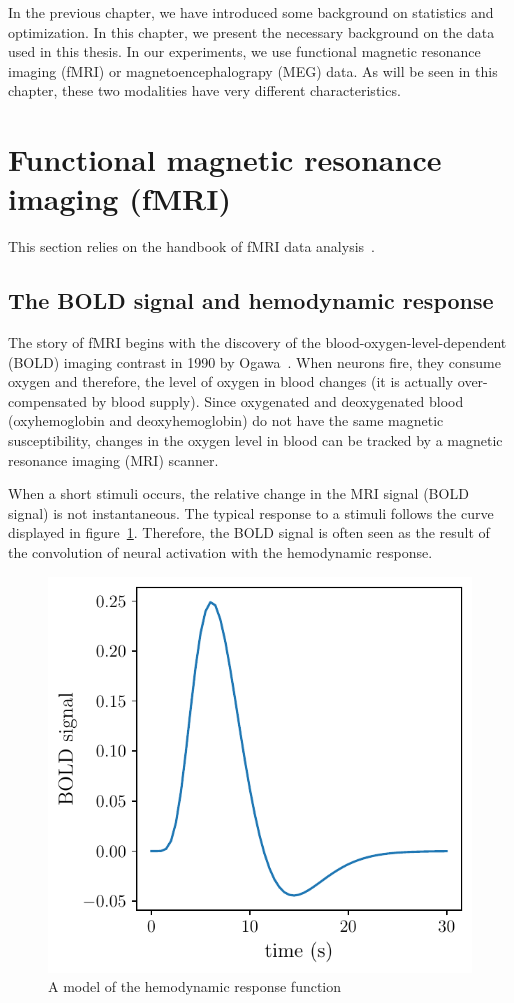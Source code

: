 In the previous chapter, we have introduced some background on statistics and
optimization.
In this chapter, we present the necessary background on the data used in this
thesis.
In our experiments, we use functional magnetic resonance imaging (fMRI) or
magnetoencephalograpy (MEG) data. As will be seen in this chapter, these two modalities have very different
characteristics.

\section{Functional magnetic resonance imaging (fMRI)}
This section relies on the handbook of fMRI data analysis~\cite{poldrack2011handbook}.

\subsection{The BOLD signal and hemodynamic response}
The story of fMRI begins with the discovery of the blood-oxygen-level-dependent
(BOLD) imaging contrast in 1990 by Ogawa~\cite{ogawa1990brain}. When neurons
fire, they consume oxygen and therefore, the level of oxygen in blood changes (it is actually over-compensated by blood supply).
Since oxygenated and deoxygenated blood (oxyhemoglobin
and deoxyhemoglobin) do not have the same magnetic susceptibility, changes in
the oxygen level in blood can be tracked by a magnetic resonance imaging (MRI) scanner.

When a short stimuli occurs, the relative change in the MRI signal (BOLD
signal) is not instantaneous. The typical response to a stimuli follows the
curve displayed in figure~\ref{fig:hrf}.
Therefore, the BOLD signal is often seen as the result of the convolution of neural activation with the hemodynamic response.

\begin{figure}
  \center
  \includegraphics[scale=0.8]{figures/neuroscience/hrf.pdf}
  \caption{A model of the hemodynamic response function}
  \label{fig:hrf}
\end{figure}

